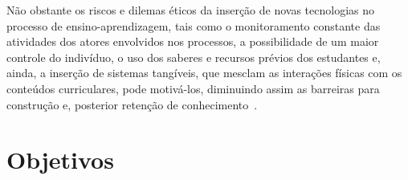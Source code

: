 Não obstante os riscos e dilemas éticos da inserção de novas tecnologias no processo de ensino-aprendizagem, tais como o monitoramento constante das atividades dos atores envolvidos nos processos, a possibilidade de um maior controle do indivíduo, o uso dos saberes e recursos prévios dos estudantes e, ainda, a inserção de sistemas tangíveis, que mesclam as interações físicas com os conteúdos curriculares, pode motivá-los, diminuindo assim as barreiras para construção e, posterior retenção de conhecimento~\citep{Nogueira:2013, Sousa:2011}. 




\section{Objetivos}
\label{section:goals}



